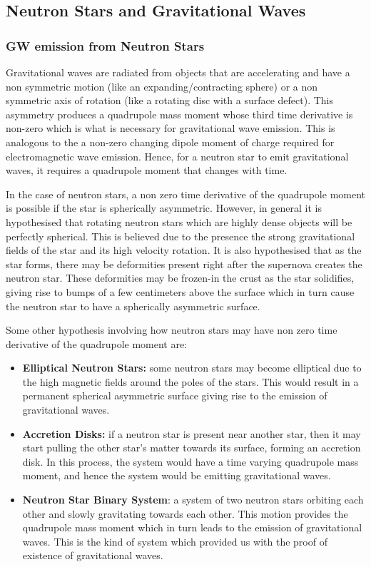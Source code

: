 \documentclass[%
reprint,
amsmath,amssymb,
aps,
]{revtex4-1}
\begin{document}
	\subsection{Neutron Stars and Gravitational Waves}
	\subsubsection{GW emission from Neutron Stars}
	Gravitational waves are radiated from objects that are accelerating and have a non symmetric motion (like an expanding/contracting sphere) or a non symmetric axis of rotation (like a rotating disc with a surface defect). This asymmetry produces a quadrupole mass moment whose third time derivative is non-zero which is what is necessary for gravitational wave emission. This is analogous to the a non-zero changing dipole moment of charge required for electromagnetic wave emission. Hence, for a neutron star to emit gravitational waves, it requires a quadrupole moment that changes with time. 
	
	In the case of neutron stars, a non zero time derivative of the quadrupole moment is possible if the star is spherically asymmetric. However, in general it is hypothesised that rotating neutron stars which are highly dense objects will be perfectly spherical. This is believed due to the presence the strong gravitational fields of the star and its high velocity rotation. It is also hypothesised that as the star forms, there may be deformities present right after the supernova creates the neutron star. These deformities may be frozen-in the crust as the star solidifies, giving rise to bumps of a few centimeters above the surface which in turn cause the neutron star to have a spherically asymmetric surface. 
	
	Some other hypothesis involving how neutron stars may have non zero time derivative of the quadrupole moment are:
	\begin{itemize}
		\item{\textbf{Elliptical Neutron Stars:} some neutron stars may become elliptical due to the high magnetic fields around the poles of the stars. This would result in a permanent spherical asymmetric surface giving rise to the emission of gravitational waves.}
		\item{\textbf{Accretion Disks:} if a neutron star is present near another star, then it may start pulling the other star's matter towards its surface, forming an accretion disk. In this process, the system would have a time varying quadrupole mass moment, and hence the system would be emitting gravitational waves.}
		\item{\textbf{Neutron Star Binary System}: a system of two neutron stars orbiting each other and slowly gravitating towards each other. This motion provides the quadrupole mass moment which in turn leads to the emission of gravitational waves. This is the kind of system which provided us with the proof of existence of gravitational waves. }
	\end{itemize}
	
\end{document}

